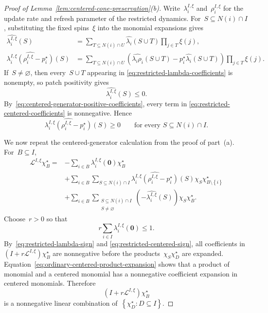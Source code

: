 \documentclass[EJP,preprint,NODS,nobera]{ejpecp}
\newcommand{\bb}[1]{\left(#1\right)}
\newcommand{\cb}[1]{\left\{#1\right\}}
\newcommand{\mb}[1]{\mathbf{#1}}
\newcommand{\Lcal}{\mathcal{L}}
\begin{document}
\begin{proof}[Proof of Lemma~\ref{lem:centered-cone-preservation}\textup{(b)}]
Write~$\lambda_i^{I,\xi}$ and~$\rho_i^{I,\xi}$ for the update rate and
refresh parameter of the restricted dynamics. For~$S\subseteq N(i)\cap I$,
substituting the fixed spins~$\xi$ into the monomial expansions gives
\begin{align}
\widehat{\lambda_i^{I,\xi}}(S)
&=
\sum_{T\subseteq N(i)\cap U}
\widehat{\lambda_i}(S\cup T)
\prod_{j\in T}\xi(j),
\label{eq:restricted-lambda-coefficients}
\\
\widehat{
\lambda_i^{I,\xi}
\bb{\rho_i^{I,\xi}-p_i^\star}
}(S)
&=
\sum_{T\subseteq N(i)\cap U}
\bb{
\widehat{\lambda_i\rho_i}(S\cup T)
-
p_i^\star\widehat{\lambda_i}(S\cup T)
}
\prod_{j\in T}\xi(j).
\label{eq:restricted-centered-coefficients}
\end{align}
If~$S\neq\varnothing$, then every~$S\cup T$ appearing in
\eqref{eq:restricted-lambda-coefficients} is nonempty, so patch positivity
gives
\begin{equation}
\label{eq:restricted-lambda-sign}
\widehat{\lambda_i^{I,\xi}}(S)\leq0.
\end{equation}
By~\eqref{eq:centered-generator-positive-coefficients}, every term in
\eqref{eq:restricted-centered-coefficients} is nonnegative. Hence
\begin{equation}
\label{eq:restricted-centered-sign}
\widehat{
\lambda_i^{I,\xi}
\bb{\rho_i^{I,\xi}-p_i^\star}
}(S)
\geq0
\qquad
\text{for every }S\subseteq N(i)\cap I.
\end{equation}

We now repeat the centered-generator calculation from the proof of part~\textup{(a)}. For~$B\subseteq I$,
\begin{align*}
\Lcal^{I,\xi}\chi_B^\star
={}&
-\sum_{i\in B}
\lambda_i^{I,\xi}(\mb 0)\chi_B^\star
\\
&+
\sum_{i\in B}
\sum_{S\subseteq N(i)\cap I}
\widehat{
\lambda_i^{I,\xi}
\bb{\rho_i^{I,\xi}-p_i^\star}
}(S)
\chi_S\chi_{B\setminus\cb{i}}^\star
\\
&+
\sum_{i\in B}
\sum_{\substack{S\subseteq N(i)\cap I\\S\neq\varnothing}}
\bb{-\widehat{\lambda_i^{I,\xi}}(S)}
\chi_S\chi_B^\star.
\end{align*}
Choose~$r>0$ so that
\begin{equation*}
r\sum_{i\in I}\lambda_i^{I,\xi}(\mb 0)\leq1.
\end{equation*}
By~\eqref{eq:restricted-lambda-sign} and
\eqref{eq:restricted-centered-sign}, all coefficients in~$(I+r\Lcal^{I,\xi})\chi_B^\star$ are nonnegative before the products~$\chi_S\chi_D^\star$ are expanded. Equation~\eqref{eq:ordinary-centered-product-expansion} shows that a product of monomial and a centered monomial has a nonnegative coefficient expansion in centered monomials. Therefore
\begin{equation*}
\bb{I+r\Lcal^{I,\xi}}\chi_B^\star
\end{equation*}
is a nonnegative linear combination of~$\cb{\chi_D^\star:D\subseteq I}$.


\end{proof}
\end{document}
